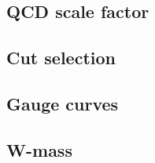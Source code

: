 \subsection{QCD scale factor}

\subsection{Cut selection}

\subsection{Gauge curves}

\subsection{W-mass }